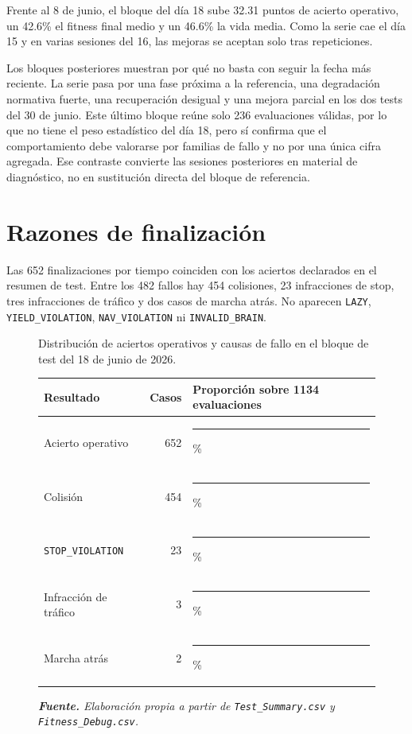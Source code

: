 Frente al 8 de junio, el bloque del día 18 sube 32.31 puntos de acierto operativo, un 42.6\% el fitness final medio y un 46.6\% la vida media. Como la serie cae el día 15 y en varias sesiones del 16, las mejoras se aceptan solo tras repeticiones.

Los bloques posteriores muestran por qué no basta con seguir la fecha más reciente. La serie pasa por una fase próxima a la referencia, una degradación normativa fuerte, una recuperación desigual y una mejora parcial en los dos tests del 30 de junio. Este último bloque reúne solo 236 evaluaciones válidas, por lo que no tiene el peso estadístico del día 18, pero sí confirma que el comportamiento debe valorarse por familias de fallo y no por una única cifra agregada. Ese contraste convierte las sesiones posteriores en material de diagnóstico, no en sustitución directa del bloque de referencia.

\section{Razones de finalización}

Las 652 finalizaciones por tiempo coinciden con los aciertos declarados en el resumen de test. Entre los 482 fallos hay 454 colisiones, 23 infracciones de stop, tres infracciones de tráfico y dos casos de marcha atrás. No aparecen \texttt{LAZY}, \texttt{YIELD\_VIOLATION}, \texttt{NAV\_VIOLATION} ni \texttt{INVALID\_BRAIN}.

\begin{figure}[htbp]
\centering
\caption[Distribución de aciertos y causas de fallo en test.]{Distribución de aciertos operativos y causas de fallo en el bloque de test del 18 de junio de 2026.}%
\label{fig:distribucion-test}
\small
\begin{tabularx}{0.94\textwidth}{L{3.2cm}rX}
\toprule
\textbf{Resultado} & \textbf{Casos} & \textbf{Proporción sobre 1134 evaluaciones}\\
\midrule
Acierto operativo & 652 & \rule{4.60cm}{0.18cm}\%\\
Colisión & 454 & \rule{3.20cm}{0.18cm}\%\\
\texttt{STOP\_VIOLATION} & 23 & \rule{0.16cm}{0.18cm}\%\\
Infracción de tráfico & 3 & \rule{0.03cm}{0.18cm}\%\\
Marcha atrás & 2 & \rule{0.02cm}{0.18cm}\%\\
\bottomrule
\end{tabularx}
\caption*{\textit{\textbf{Fuente.} Elaboración propia a partir de \texttt{Test\_Summary.csv} y \texttt{Fitness\_Debug.csv}.}}
\end{figure}

